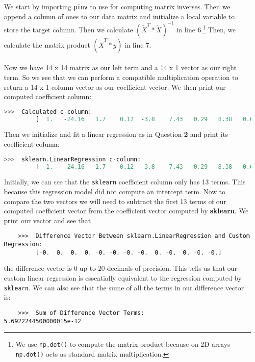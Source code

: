 \documentclass[12pt, letterpaper]{article}
\begin{document}
    We start by importing \texttt{pinv} to use for computing matrix inverses. Then we append a column 
    of ones to our data matrix and initialize a local variable to store the target column. Then we calculate
    $(\tilde{X}^{T} * \tilde{X})^{-1}$ in line 6.\footnote[1]{We use \texttt{np.dot()} to compute the 
    matrix product because on 2D arrays \texttt{np.dot()} acts as standard matrix multiplication.} 
    Then, we calculate the matrix product $(\tilde{X}^{T} * y)$ in line 7. \\ \\
    Now we have 14 x 14 matrix as our left term and a 14 x 1 vector as our right term. So we see that we 
    can perform a compatible multiplication operation to return a 14 x 1 column vector as our coefficient
    vector. We then print our computed coefficient column:
\begin{lstlisting}[language=python]
    >>>  Calculated c-column:
         [  1.   -24.16   1.7    0.12  -3.8    7.43   0.29   8.38   0.67  -5.05  2.79   1.6    0.77  132.31]
\end{lstlisting}
    Then we initialize and fit a linear regression as in Question {\bf 2} and print its coefficient column:
\begin{lstlisting}[language=python]
    >>>  sklearn.LinearRegression c-column:
         [  1.   -24.16   1.7    0.12  -3.8    7.43   0.29   8.38   0.67  -5.05  2.79   1.6    0.77]
\end{lstlisting}
    Initially, we can see that the \texttt{sklearn} coefficient column only has 13 terms. This 
    because this regression model did not compute an intercept term. Now to compare the two vectors 
    we will need to subtract the first 13 terms of our computed coefficient vector from the coefficient 
    vector computed by {\bf sklearn}. We print our vector and see that 
\begin{lstlisting}
    >>>  Difference Vector Between sklearn.LinearRegression and Custom Regression:
         [-0.  0.  0.  0. -0. -0. -0. -0.  0. -0.  0. -0. -0.]   
\end{lstlisting}
    the difference vector is 0 up to 20 decimals of precision. This tells us that our custom linear regression 
    is essentially equivalent to the regression computed by \texttt{sklearn}. We can also see that the sume 
    of all the terms in our difference vector is:
\begin{lstlisting}
    >>>  Sum of Difference Vector Terms:              5.6922244500000015e-12
\end{lstlisting}
\end{document}
